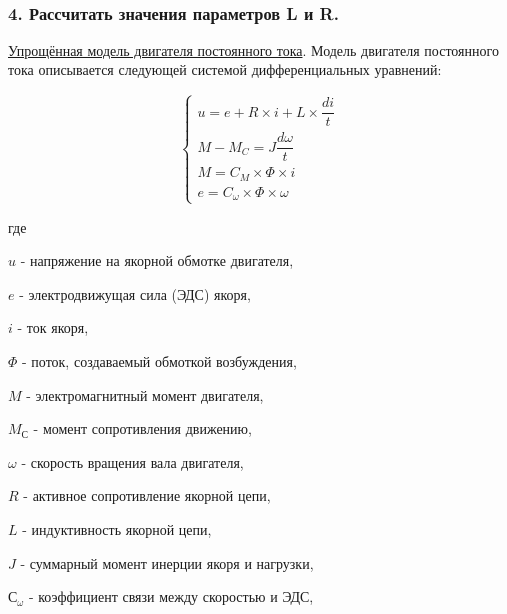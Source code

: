\documentclass[11pt]{article}
\begin{document}
    \begin{center}
    \end{center}
    { \hspace*{\fill} \\}
    
    \hypertarget{ux440ux430ux441ux441ux447ux438ux442ux430ux442ux44c-ux437ux43dux430ux447ux435ux43dux438ux44f-ux43fux430ux440ux430ux43cux435ux442ux440ux43eux432-l-ux438-r.}{%
\subsubsection{4. Рассчитать значения параметров L и
R.}\label{ux440ux430ux441ux441ux447ux438ux442ux430ux442ux44c-ux437ux43dux430ux447ux435ux43dux438ux44f-ux43fux430ux440ux430ux43cux435ux442ux440ux43eux432-l-ux438-r.}}

    \href{https://life-prog.ru/2_22546_model-dvigatelya-postoyannogo-toka-s-nezavisimim-vozbuzhdeniem.html}{Упрощённая
модель двигателя постоянного тока}. Модель двигателя постоянного тока
описывается следующей системой дифференциальных уравнений:

\[
\begin{cases}
u = e + R \times i + L \times \dfrac{di}{t}
\\
M - M_C = J \dfrac{d\omega}{t}
\\
M = C_{M} \times \Phi \times i
\\
e = C_{\omega} \times \Phi \times \omega
\end{cases}
\]

где

\(u\) - напряжение на якорной обмотке двигателя,

\(e\) - электродвижущая сила (ЭДС) якоря,

\(i\) - ток якоря,

\(\Phi\) - поток, создаваемый обмоткой возбуждения,

\(M\) - электромагнитный момент двигателя,

\(M_С\) - момент сопротивления движению,

\(\omega\) - скорость вращения вала двигателя,

\(R\) - активное сопротивление якорной цепи,

\(L\) - индуктивность якорной цепи,

\(J\) - суммарный момент инерции якоря и нагрузки,

\(С_{\omega}\) - коэффициент связи между скоростью и ЭДС,
\end{document}
